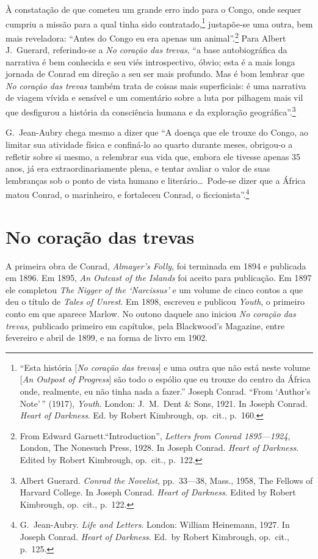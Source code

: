 À constatação de que cometeu um grande erro indo para o Congo,
onde sequer cumpriu a missão para a qual tinha sido
contratado,\footnote{ ``Esta história [\textit{No coração das trevas}] e uma outra que não
está neste volume [\textit{An Outpost of Progress}] são todo o espólio
que eu trouxe do centro da África onde, realmente, eu não tinha nada a
fazer.'' Joseph Conrad. ``From `Author's Note'\,'' (1917), \textit{Youth}.
London: J.~M.~Dent \& Sons, 1921. In Joseph Conrad. \textit{Heart of
Darkness}. Ed. by Robert Kimbrough, op.~cit., p.~160.} 
justapõe{}-se uma outra, bem mais reveladora: ``Antes do Congo
eu era apenas um animal''.\footnote{ From Edward Garnett.``Introduction'', 
\textit{Letters from Conrad 1895---1924}, London, The Nonesuch Press, 1928. In Joseph Conrad.
\textit{Heart of Darkness}. Edited by Robert Kimbrough, op.~cit., p.~122.}
Para Albert J.~Guerard, referindo{}-se a \textit{No coração das trevas}, 
``a base autobiográfica da narrativa é bem conhecida e seu viés introspectivo, óbvio; esta é a mais longa jornada
de Conrad em direção a seu ser mais profundo. Mas é bom lembrar que
\textit{No coração das trevas} também trata de coisas mais superficiais: 
é uma narrativa de viagem vívida e sensível
e um comentário sobre a luta por pilhagem mais vil que desfigurou a
história da consciência humana e da exploração
geográfica''.\footnote{ Albert Guerard. \textit{Conrad the Novelist}, pp.~33---38, Mass., 1958,
The Fellows of Harvard College. In Joseph Conrad. \textit{Heart of
Darkness}. Edited by Robert Kimbrough, op.~cit., p.~122.}

G.~Jean{}-Aubry chega mesmo a dizer que ``A doença que ele
trouxe do Congo, ao limitar sua atividade física e confiná{}-lo ao
quarto durante meses, obrigou{}-o a refletir sobre si mesmo, a
relembrar sua vida que, embora ele tivesse apenas 35 anos, já era
extraordinariamente plena, e tentar avaliar o valor de suas lembranças
sob o ponto de vista humano e literário\ldots\ Pode{}-se dizer que a
África matou Conrad, o marinheiro, e fortaleceu Conrad, o
ficcionista''.\footnote{ G.~Jean{}-Aubry. \textit{Life and Letters}. London: William Heinemann,
1927. In Joseph Conrad. \textit{Heart of Darkness}. Ed.~by Robert Kimbrough, op.~cit., p.~125.}

\section{No coração das trevas}

A primeira obra de Conrad, \textit{Almayer's Folly}, foi terminada em
1894 e publicada em 1896. Em 1895, \textit{An Outcast of the Islands}
foi aceito para publicação.  Em 1897 ele completou \textit{The Nigger
of the `Narcissus'} e um volume de cinco contos a que deu o título de
\textit{Tales of Unrest}. Em  1898, escreveu e publicou \textit{Youth},
o primeiro conto em que aparece Marlow. No outono daquele ano iniciou
\textit{No coração das trevas}, publicado primeiro em capítulos, pela
Blackwood's Magazine, entre fevereiro e abril de 1899, e na forma de livro em 1902.

